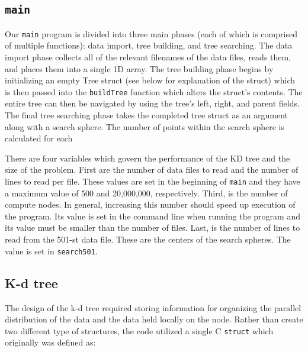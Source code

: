 \documentclass{article}
\begin{document}
%
%

\subsection{\texttt{main}}
Our \texttt{main} program is divided into three main phases (each of which is comprised of multiple functions): data import, tree building, and tree searching. The data import phase collects all of the relevant filenames of the data files, reads them, and places them into a single 1D array. The tree building phase begins by initializing an empty Tree struct (see below for explanation of the struct) which is then passed into the \texttt{buildTree} function which alters the struct's contents. The entire tree can then be navigated by using the tree's left, right, and parent fields. The final tree searching phase takes the completed tree struct as an argument along with a search sphere. The number of points within the search sphere is calculated for each

There are four variables which govern the performance of the KD tree and the size of the problem. First are the number of data files to read and the number of lines to read per file. These values are set in the beginning of \texttt{main} and they have a maximum value of 500 and 20,000,000, respectively. Third, is the number of compute nodes. In general, increasing this number should speed up execution of the program. Its value is set in the command line when running the program and its value must be smaller than the number of files. Last, is the number of lines to read from the 501-st data file. These are the centers of the search spheres. The value is set in \texttt{search501}.






%
%

\subsection{K-d tree}
%
%

The design of the k-d tree required storing information for organizing the parallel distribution of the data and the data held locally on the node. Rather than create two different type of structures, the code utilized a single C \texttt{struct} which originally was defined as:
\end{document}
